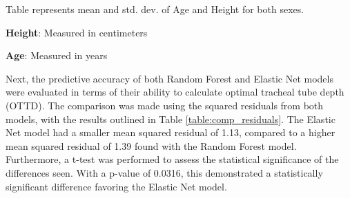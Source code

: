 \documentclass[11pt]{article}
\begin{document}
\begin{table}[h]
\caption{Descriptive stats of Height and Age separated by Sex}
\label{table:desc_stat_sex}
\begin{threeparttable}
\renewcommand{\TPTminimum}{\linewidth}
\begin{tablenotes}
\footnotesize
\item Table represents mean and std. dev. of Age and Height for both sexes.
\item \textbf{Height}: Measured in centimeters
\item \textbf{Age}: Measured in years
\end{tablenotes}
\end{threeparttable}
\end{table}


Next, the predictive accuracy of both Random Forest and Elastic Net models were evaluated in terms of their ability to calculate optimal tracheal tube depth (OTTD). The comparison was made using the squared residuals from both models, with the results outlined in Table {}\ref{table:comp_residuals}. The Elastic Net model had a smaller mean squared residual of 1.13, compared to a higher mean squared residual of 1.39 found with the Random Forest model. Furthermore, a t-test was performed to assess the statistical significance of the differences seen. With a p-value of 0.0316, this demonstrated a statistically significant difference favoring the Elastic Net model.
\end{document}
